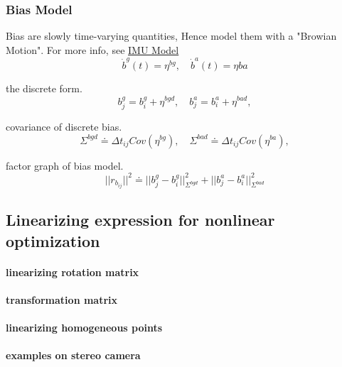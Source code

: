 \documentclass[10pt,a4paper]{article}
\begin{document}
\subsubsection{Bias Model}
Bias are slowly time-varying quantities, Hence model them with a "Browian Motion".
For more info, see \href{http://www.cnblogs.com/youzx/p/6291327.html?utm_source=itdadao&utm_medium=referral}{IMU Model}
\begin{equation}
\dot{b}^g(t) = \eta^{bg}, \quad \dot{b}^a(t) = \eta{ba}
\end{equation}

the discrete form.
\begin{equation}
b^g_j= b^g_i + \eta^{bgd}, \quad b^a_j= b^a_i + \eta^{bad},
\end{equation}

covariance of discrete bias.
\begin{equation}
\Sigma^{bgd} \doteq \Delta t_{ij} Cov(\eta^{bg}), \quad \Sigma^{bad} \doteq \Delta t_{ij} Cov(\eta^{ba}),
\end{equation}

factor graph of bias model.
\begin{equation}
||r_{b_{ij}} ||^2 \doteq ||b_j^g - b_i^g||_{\Sigma^{bgd}}^2 + ||b_j^a - b_i^a||_{\Sigma^{bad}}^2
\end{equation}

\subsection{Linearizing expression for nonlinear optimization}
\paragraph{linearizing rotation matrix}
\paragraph{transformation matrix}
\paragraph{linearizing homogeneous points}
\paragraph{examples on stereo camera}
\subsection{}
\subsection{}
\end{document}
